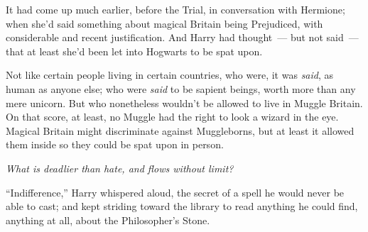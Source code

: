 It had come up much earlier, before the Trial, in conversation with Hermione; when she'd said something about magical Britain being Prejudiced, with considerable and recent justification. And Harry had thought~--- but not said~--- that at least she'd been let into Hogwarts to be spat upon.

Not like certain people living in certain countries, who were, it was \emph{said}, as human as anyone else; who were \emph{said} to be sapient beings, worth more than any mere unicorn. But who nonetheless wouldn't be allowed to live in Muggle Britain. On that score, at least, no Muggle had the right to look a wizard in the eye. Magical Britain might discriminate against Muggleborns, but at least it allowed them inside so they could be spat upon in person.

\emph{What is deadlier than hate, and flows without limit?}

``Indifference,'' Harry whispered aloud, the secret of a spell he would never be able to cast; and kept striding toward the library to read anything he could find, anything at all, about the Philosopher's Stone.
